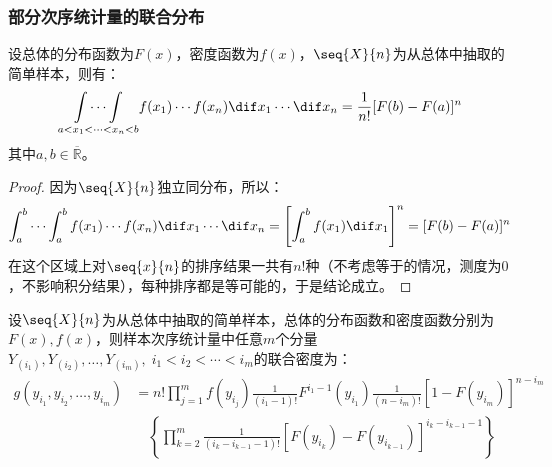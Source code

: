 \subsubsection{部分次序统计量的联合分布}
\begin{lemma}\label{lem:OrderStatistics}
	设总体的分布函数为$F(x)$，密度函数为$f(x)$，$\seq{X}{n}$为从总体中抽取的简单样本，则有：
	\begin{equation*}
		\underset{a<x_1<\cdots<x_n<b}{\int\cdots\int}f(x_1)\cdots f(x_n)\dif x_1\cdots\dif x_n=\frac{1}{n!}[F(b)-F(a)]^n
	\end{equation*}
	其中$a,b\in\overline{\mathbb{R}}$。
\end{lemma}
\begin{proof}
	因为$\seq{X}{n}$独立同分布，所以：
	\begin{equation*}
		\int_{a}^{b}\cdots\int_{a}^{b}f(x_1)\cdots f(x_n)\dif x_1\cdots\dif x_n=\left[\int_{a}^{b}f(x_1)\dif x_1\right]^n=[F(b)-F(a)]^n
	\end{equation*}
	在这个区域上对$\seq{x}{n}$的排序结果一共有$n!$种（不考虑等于的情况，测度为$0$，不影响积分结果），每种排序都是等可能的，于是结论成立。
\end{proof}
\begin{theorem}\label{theo:PartialOrderStatisticsDist}
	设$\seq{X}{n}$为从总体中抽取的简单样本，总体的分布函数和密度函数分别为$F(x),f(x)$，则样本次序统计量中任意$m$个分量$Y_{(i_1)},Y_{(i_2)},\dots,Y_{(i_m)},\;i_1<i_2<\cdots<i_m$的联合密度为：
	\begin{align*}
		g(y_{i_1},y_{i_2},\dots,y_{i_m})
		&=n!\prod_{j=1}^{m}f(y_{i_j})\frac{1}{(i_1-1)!}F^{i_1-1}(y_{i_1})\frac{1}{(n-i_m)!}[1-F(y_{i_m})]^{n-i_m} \\
		&\quad\left\{\prod_{k=2}^{m}\frac{1}{(i_k-i_{k-1}-1)!}[F(y_{i_k})-F(y_{i_{k-1}})]^{i_k-i_{k-1}-1}\right\}
	\end{align*}
\end{theorem}
